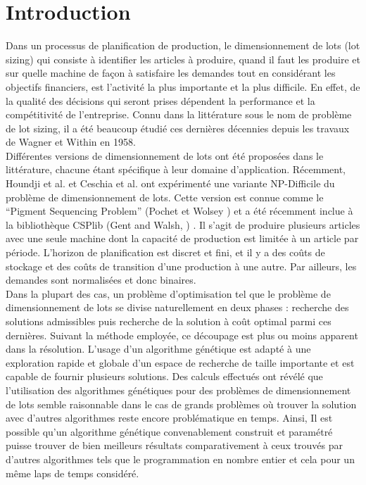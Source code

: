 \documentclass[12pt,a4paper]{article}
\begin{document}
	  
	
	\newpage
	
	\part*{Introduction}
	
	Dans un processus de planification de production, le dimensionnement
de lots (lot sizing) qui consiste à identifier les articles à produire, quand il
faut les produire et sur quelle machine de façon à satisfaire les demandes
tout en considérant les objectifs financiers, est l’activité la plus importante
et la plus difficile. En effet, de la qualité des décisions qui seront prises
dépendent la performance et la compétitivité de l’entreprise. Connu dans la
littérature sous le nom de problème de lot sizing, il a été beaucoup étudié
ces dernières décennies depuis les travaux de Wagner et Within en 1958. \\
	\hspace*{.5cm} Différentes versions de dimensionnement de lots ont été proposées dans le littérature, chacune étant spécifique à leur domaine d'application. Récemment, Houndji et al. \cite{hvr_stockingCost} et Ceschia et al. \cite{opthub} ont expérimenté une variante NP-Difficile du problème de dimensionnement de lots. Cette version est connue comme le “Pigment Sequencing Problem” (Pochet et Wolsey \cite{pochet_wolsey}) et a été récemment inclue à la bibliothèque CSPlib (Gent and Walsh, \cite{gent_walsh}) . Il s'agit de produire plusieurs articles avec une seule machine dont la capacité de production est limitée à un article par période. L'horizon de planification est discret et fini, et il y a des coûts de stockage et des coûts de transition d'une production à une autre. Par ailleurs, les demandes sont normalisées et donc binaires. \\
	\hspace*{.5cm} Dans la plupart des cas, un problème d’optimisation tel que le problème de dimensionnement de lots se divise naturellement en deux phases : recherche des solutions admissibles puis recherche de la solution à coût optimal parmi ces dernières. Suivant la méthode employée, ce découpage est plus ou moins apparent dans la résolution. L’usage d’un algorithme génétique est adapté à une exploration rapide et globale d’un espace de recherche de taille importante et est capable de fournir plusieurs solutions. Des calculs effectués ont révélé que l'utilisation des algorithmes génétiques pour des problèmes de dimensionnement de lots semble raisonnable dans le cas de grands problèmes où trouver la solution avec d'autres algorithmes reste encore problématique en temps. Ainsi, Il est possible qu'un algorithme génétique convenablement construit et paramétré puisse trouver de bien meilleurs résultats comparativement à ceux trouvés par d'autres algorithmes tels que le programmation en nombre entier et cela pour un même laps de temps considéré.
	
\end{document}

